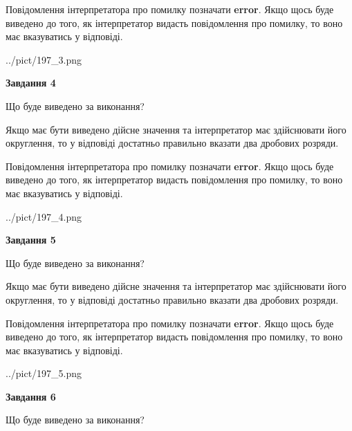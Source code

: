 \documentclass[12pt, ukrainian]{article}
\begin{document}
{\begin {Large}
Повідомлення інтерпретатора про помилку позначати \textbf{error}.
Якщо щось буде виведено до того, як інтерпретатор видасть повідомлення про помилку, 
то воно має вказуватись у відповіді. \par

\begin{center}
	{../pict/197_3.png}
\end{center}
\newpage

{\begin {center}\textbf{Завдання 4}\end {center}}\par
Що буде виведено за виконання? \par

Якщо має бути виведено дійсне значення та інтерпретатор має здійснювати його округлення, 
то у відповіді достатньо правильно вказати два дробових розряди.

Повідомлення інтерпретатора про помилку позначати \textbf{error}.
Якщо щось буде виведено до того, як інтерпретатор видасть повідомлення про помилку, 
то воно має вказуватись у відповіді. \par

\begin{center}
	{../pict/197_4.png}
\end{center}
\newpage

{\begin {center}\textbf{Завдання 5}\end {center}}\par
Що буде виведено за виконання? \par

Якщо має бути виведено дійсне значення та інтерпретатор має здійснювати його округлення, 
то у відповіді достатньо правильно вказати два дробових розряди.

Повідомлення інтерпретатора про помилку позначати \textbf{error}.
Якщо щось буде виведено до того, як інтерпретатор видасть повідомлення про помилку, 
то воно має вказуватись у відповіді. \par

\begin{center}
	{../pict/197_5.png}
\end{center}
\newpage

{\begin {center}\textbf{Завдання 6}\end {center}}\par
Що буде виведено за виконання? \par


\end{Large}}
\end{document}
